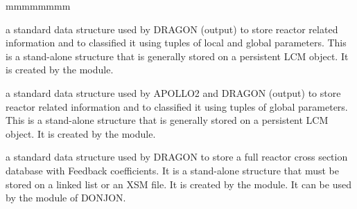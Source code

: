 \begin{ListeDeDescription}{mmmmmmmm}
\item[\dds{multicompo}] a standard data structure used by DRAGON (output) to store
reactor related information and to classified it using tuples of local and global
parameters. This is a stand-alone structure that is generally
stored on a persistent LCM object. It is created by the  module.

\item[\dds{saphyb}] a standard data structure used by APOLLO2 and DRAGON (output) to store
reactor related information and to classified it using tuples of global
parameters. This is a stand-alone structure that is generally
stored on a persistent LCM object. It is created by the  module.

\item[\dds{fbmxsdb}] a standard data structure used by DRAGON to store
a full reactor cross section database with Feedback coefficients. 
It is a stand-alone structure that must be stored on a linked list or an XSM file. It is created by the  module. It can be used by the  module of DONJON.\cite{sissaoui}

\end{ListeDeDescription}

